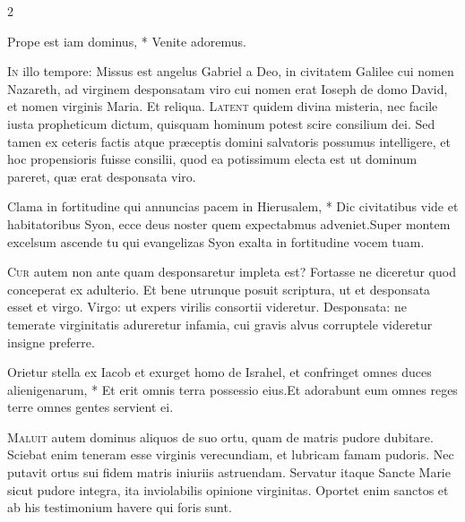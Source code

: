 \begin{multicols*}{2}
\begin{invitatory}
{Prope est iam dominus, * Venite adoremus.}
\end{invitatory}
\lettrine[lines=2]{\zallmancaps \color{Blue} I}{n} illo tempore: Missus est angelus Gabriel a Deo, in civitatem Galilee cui nomen Nazareth, ad virginem desponsatam viro cui nomen erat Ioseph de domo David, et nomen virginis Maria. Et reliqua.
\lettrine[lines=2]{\zallmancaps \color{Red} L}{atent} quidem divina misteria, nec facile iusta propheticum dictum, quisquam hominum potest scire consilium dei. Sed tamen ex ceteris factis atque præceptis domini salvatoris possumus intelligere, et hoc propensioris fuisse consilii, quod ea potissimum electa est ut dominum pareret, quæ erat desponsata viro.
\begin{responsory}
{Clama in fortitudine qui annuncias pacem in Hierusalem, * Dic civitatibus vide et habitatoribus Syon, ecce deus noster quem expectabmus adveniet.}{Super montem excelsum ascende tu qui evangelizas Syon exalta in fortitudine vocem tuam.}
\end{responsory}%
\lettrine[lines=2]{\zallmancaps \color{Blue} C}{ur} autem non ante quam desponsaretur impleta est? Fortasse ne diceretur quod conceperat ex adulterio. Et bene utrunque posuit scriptura, ut et desponsata esset et virgo. Virgo: ut expers virilis consortii videretur. Desponsata: ne temerate virginitatis adureretur infamia, cui gravis alvus corruptele videretur insigne preferre.
\begin{responsory}
{Orietur stella ex Iacob et exurget homo de Israhel, et confringet omnes duces alienigenarum, * Et erit omnis terra possessio eius.}{Et adorabunt eum omnes reges terre omnes gentes servient ei.}
\end{responsory}%
\lettrine[lines=2]{\zallmancaps \color{Red} M}{aluit} autem dominus aliquos de suo ortu, quam de matris pudore dubitare. Sciebat enim teneram esse virginis verecundiam, et lubricam famam pudoris. Nec putavit ortus sui fidem matris iniuriis astruendam. Servatur itaque Sancte Marie sicut pudore integra, ita inviolabilis opinione virginitas. Oportet enim sanctos et ab his testimonium havere qui foris sunt.

\end{multicols*}
